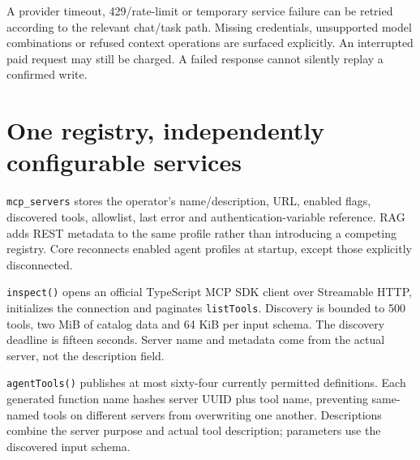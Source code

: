 A provider timeout, 429/rate-limit or temporary service failure can be retried according to the relevant chat/task path. Missing credentials, unsupported model combinations or refused context operations are surfaced explicitly. An interrupted paid request may still be charged. A failed response cannot silently replay a confirmed write.
\section*{One registry, independently configurable services}
\texttt{mcp\_servers} stores the operator's name/description, URL, enabled flags, discovered tools, allowlist, last error and authentication-variable reference. RAG adds REST metadata to the same profile rather than introducing a competing registry. Core reconnects enabled agent profiles at startup, except those explicitly disconnected.

\texttt{inspect()} opens an official TypeScript MCP SDK client over Streamable HTTP, initializes the connection and paginates \texttt{listTools}. Discovery is bounded to 500 tools, two MiB of catalog data and 64 KiB per input schema. The discovery deadline is fifteen seconds. Server name and metadata come from the actual server, not the description field.

\texttt{agentTools()} publishes at most sixty-four currently permitted definitions. Each generated function name hashes server UUID plus tool name, preventing same-named tools on different servers from overwriting one another. Descriptions combine the server purpose and actual tool description; parameters use the discovered input schema.
\begin{center}\end{center}
